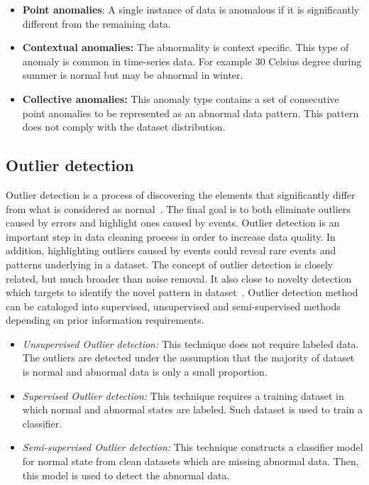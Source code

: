 \begin{itemize}

	\item \textbf{Point anomalies}: A single instance of data is anomalous if it is significantly different from the remaining data.
	
	\item \textbf{Contextual anomalies:} The abnormality is context specific. This type of anomaly is common in time-series data. For example 30 Celsius degree during summer is normal but may be abnormal in winter.
	
	\item \textbf{Collective anomalies:} This anomaly type contains a set of consecutive point anomalies to be represented as an abnormal data pattern. This pattern does not comply with the dataset distribution.
	
\end{itemize}

\subsection{Outlier detection}

Outlier detection is a process of discovering the elements that significantly differ from what is considered as normal~\cite{branch2013network}. The final goal is to both eliminate outliers caused by errors and highlight ones caused by events. Outlier detection is an important step in data cleaning process in order to increase data quality. In addition, highlighting outliers caused by events could reveal rare events and patterns underlying in a dataset. The concept of outlier detection is closely related, but much broader than noise removal. It also close to novelty detection which targets to identify the novel pattern in dataset~\cite{chandola2009anomaly}. Outlier detection method can be cataloged into supervised, unsupervised and semi-supervised methods depending on prior information requirements. 

\begin{itemize}

    \item \textit{Unsupervised Outlier detection: } This technique does not require labeled data. The outliers are detected under the assumption that the majority of dataset is normal and abnormal data is only a small proportion. 
    
    \item \textit{Supervised Outlier detection:} This technique requires a training dataset in which normal and abnormal states are labeled. Such dataset is used to train a classifier. 
    
    \item \textit{Semi-supervised Outlier detection: } This technique constructs a classifier model for normal state from clean datasets which are missing abnormal data. Then, this model is used to detect the abnormal data. 
    
\end{itemize}

